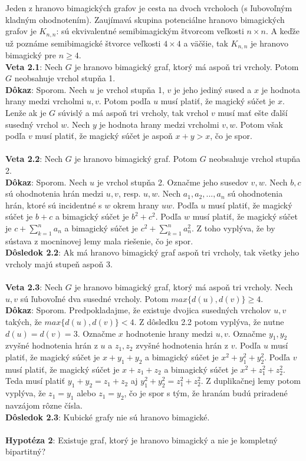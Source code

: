 \documentclass[12pt]{article}
\begin{document}
Jeden z hranovo bimagických grafov je cesta na dvoch vrcholoch (s ľubovoľným kladným ohodnotením). Zaujímavá skupina potenciálne hranovo bimagických grafov je $K _{n,n}$: sú ekvivalentné semibimagickým štvorcom veľkosti $n \times n$. A keďže už poznáme semibimagické štvorce veľkosti $4 \times 4$ a väčšie, tak $K _{n,n}$ je hranovo bimagický pre $n \geq 4$.  \\

\textbf{Veta 2.1}: Nech $G$ je hranovo bimagický graf, ktorý má aspoň tri vrcholy. Potom $G$ neobsahuje vrchol stupňa 1. \\

\textbf{Dôkaz}: Sporom. Nech $u$ je vrchol stupňa 1, $v$ je jeho jediný sused a $x$ je hodnota hrany medzi vrcholmi $u,v$. Potom podľa $u$ musí platiť, že magický súčet je $x$. Lenže ak je $G$ súvislý a má aspoň tri vrcholy, tak vrchol $v$ musí mať ešte ďalší susedný vrchol $w$. Nech $y$ je hodnota hrany medzi vrcholmi $v,w$. Potom však podľa $v$ musí platiť, že magický súčet je aspoň $x + y > x$, čo je spor. \\\\ 

\textbf{Veta 2.2}: Nech $G$ je hranovo bimagický graf. Potom $G$ neobsahuje vrchol stupňa 2. \\

\textbf{Dôkaz}: Sporom. Nech $u$ je vrchol stupňa 2. Označme jeho susedov $v,w$. Nech $b,c$ sú ohodnotenia hrán medzi $u,v$, resp. $u,w$. Nech $a_1, a_2, ... , a_n$ sú ohodnotenia hrán, ktoré sú incidentné s $w$ okrem hrany $uw$. Podľa $u$ musí platiť, že magický súčet je $b+c$ a bimagický súčet je $b^2 + c^2$. Podľa $w$ musí platiť, že magický súčet je $c + \sum_{k=1}^{n} a_n$ a bimagický súčet je $c^2 + \sum_{k=1}^{n} a^2_n$. Z toho vyplýva, že by sústava z mocninovej lemy mala riešenie, čo je spor. \\

\textbf{Dôsledok 2.2}: Ak má hranovo bimagický graf aspoň tri vrcholy, tak všetky jeho vrcholy majú stupeň aspoň 3. \\\\

\textbf{Veta 2.3}: Nech $G$ je hranovo bimagický graf, ktorý má aspoň tri vrcholy. Nech $u,v$ sú ľubovoľné dva susedné vrcholy. Potom $max \{d(u), d(v)\} \geq 4$. \\

\textbf{Dôkaz}: Sporom. Predpokladajme, že existuje dvojica susedných vrcholov $u,v$ takých, že $max \{d(u), d(v)\} < 4$. Z dôsledku 2.2 potom vyplýva, že nutne $d(u) = d(v) = 3$. Označme $x$ hodnotenie hrany medzi $u,v$. Označme $y_1, y_2$ zvyšné hodnotenia hrán z $u$ a $z_1, z_2$ zvyšné hodnotenia hrán z $v$. Podľa $u$ musí platiť, že magický súčet je $x + y_1 + y_2$ a bimagický súčet je $x^2 + y^2_1 + y^2_2$. Podľa $v$ musí platiť, že magický súčet je $x + z_1 + z_2$ a bimagický súčet je $x^2 + z^2_1 + z^2_2$. Teda musí platiť $y_1 + y_2 = z_1 + z_2$ aj $y^2_1 + y^2_2 = z^2_1 + z^2_2$. Z duplikačnej lemy potom vyplýva, že $z_1 = y_1$ alebo $z_1 = y_2$, čo je spor s tým, že hranám budú priradené navzájom rôzne čísla.  \\

\textbf{Dôsledok 2.3}: Kubické grafy nie sú hranovo bimagické. \\\\

\textbf{Hypotéza 2}: Existuje graf, ktorý je hranovo bimagický a nie je kompletný bipartitný? \\\\
\end{document}
